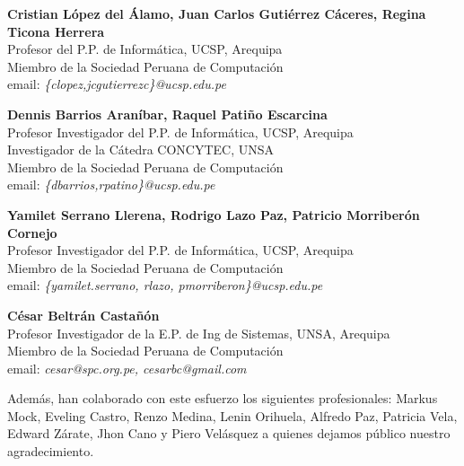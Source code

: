 \begin{center}
\textbf{Cristian López del Álamo, Juan Carlos Gutiérrez Cáceres, Regina Ticona Herrera}\\
Profesor del P.P. de Informática, UCSP, Arequipa\\
Miembro de la Sociedad Peruana de Computación\\
email: \textit{\{clopez,jcgutierrezc\}@ucsp.edu.pe}
\end{center}

\begin{center}
\textbf{Dennis Barrios Araníbar, Raquel Patiño Escarcina}\\
Profesor Investigador del P.P. de Informática, UCSP, Arequipa\\
Investigador de la Cátedra CONCYTEC, UNSA\\
Miembro de la Sociedad Peruana de Computación\\
email: \textit{\{dbarrios,rpatino\}@ucsp.edu.pe}
\end{center}

\begin{center}
\textbf{Yamilet Serrano Llerena, Rodrigo Lazo Paz, Patricio Morriberón Cornejo}\\
Profesor Investigador del P.P. de Informática, UCSP, Arequipa\\
Miembro de la Sociedad Peruana de Computación\\
email: \textit{\{yamilet.serrano, rlazo, pmorriberon\}@ucsp.edu.pe}
\end{center}

\begin{center}
\textbf{César Beltrán Castañón}\\
Profesor Investigador de la E.P. de Ing de Sistemas, UNSA, Arequipa\\
Miembro de la Sociedad Peruana de Computación\\
email: \textit{cesar@spc.org.pe, cesarbc@gmail.com}
\end{center}

Además, han colaborado con este esfuerzo los siguientes profesionales: Markus Mock, Eveling Castro, Renzo Medina, Lenin Orihuela, Alfredo Paz, Patricia Vela, Edward Zárate, Jhon Cano y Piero Velásquez a quienes dejamos público nuestro agradecimiento.
